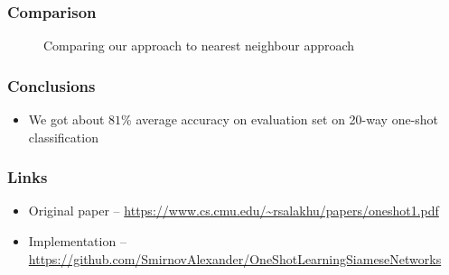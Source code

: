 \documentclass[xetex,mathserif,serif]{beamer}
\begin{document}
	\begin{frame}
		\frametitle{Comparison}
    		\begin{figure}[h]
                \caption{Comparing our approach to nearest neighbour approach}
                \label{fig:image}
            \end{figure}
	\end{frame}		
	
	\begin{frame}
		\frametitle{Conclusions}
		\begin{itemize}
			\item We got about $81$\% average accuracy on evaluation set on 20-way one-shot classification
		\end{itemize}
	\end{frame}
	
	\begin{frame}
		\frametitle{Links}
		\begin{itemize}
			\item Original paper – \url{https://www.cs.cmu.edu/~rsalakhu/papers/oneshot1.pdf}
			\item Implementation – \url{https://github.com/SmirnovAlexander/OneShotLearningSiameseNetworks}
		\end{itemize}
	\end{frame}
\end{document}
